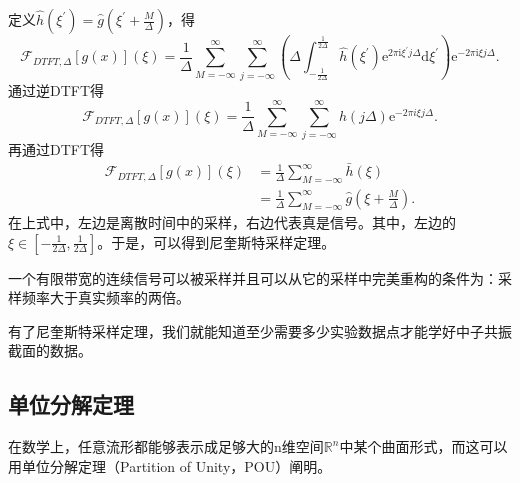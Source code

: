 定义$\hat{h}\left(\xi^{\prime}\right)=\hat{g}\left(\xi^{\prime}+\frac{M}{\Delta}\right)$，得
\begin{equation}
\mathcal{F}_{D T F T, \Delta}[g(x)](\xi)=\frac{1}{\Delta} \sum_{M=-\infty}^{\infty} \sum_{j=-\infty}^{\infty}\left(\Delta \int_{-\frac{1}{2 \Delta}}^{\frac{1}{2 \Delta}} \hat{h}\left(\xi^{\prime}\right) \mathrm{e}^{2 \pi \mathrm{i} \xi^{\prime} j \Delta} \mathrm{d} \xi^{\prime}\right) \mathrm{e}^{-2 \pi \mathrm{i} \xi j \Delta} .
\end{equation}
通过逆DTFT得
\begin{equation}
    \mathcal{F}_{DTFT,\Delta}[g(x)](\xi)=\dfrac{1}{\Delta}\sum\limits_{M=-\infty}^\infty\sum\limits_{j=-\infty}^\infty h(j\Delta)\mathrm{e}^{-2\pi i\xi j\Delta}.
\end{equation}
再通过DTFT得
\begin{equation}
    \begin{aligned}\mathcal{F}_{DTFT,\Delta}[g(x)](\xi)&=\frac{1}{\Delta}\sum_{M=-\infty}^\infty\bar{h}(\xi)\\ &=\frac{1}{\Delta}\sum_{M=-\infty}^\infty\hat{g}(\xi+\frac{M}{\Delta}).\end{aligned}
\end{equation}
在上式中，左边是离散时间中的采样，右边代表真是信号。其中，左边的$\xi \in [-\frac{1}{2\Delta },\frac{1}{2\Delta }  ]$。于是，可以得到尼奎斯特采样定理\cite{benedetto2001modern}。
\begin{thm}
一个有限带宽的连续信号可以被采样并且可以从它的采样中完美重构的条件为：采样频率大于真实频率的两倍。
\end{thm}
有了尼奎斯特采样定理，我们就能知道至少需要多少实验数据点才能学好中子共振截面的数据。

\subsection{单位分解定理}
在数学上，任意流形都能够表示成足够大的n维空间$\mathbb{R}^n$中某个曲面形式，而这可以用单位分解定理（Partition of Unity，POU）\cite{卓里奇2019数学分析}阐明。

